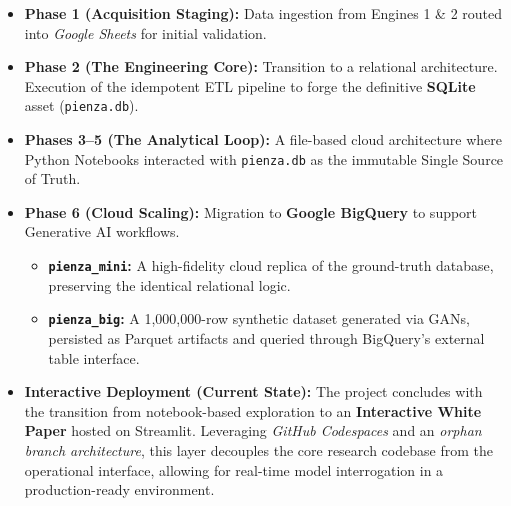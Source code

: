 \begin{itemize}
    \item \textbf{Phase 1 (Acquisition Staging):} Data ingestion from Engines 1 \& 2 routed into \textit{Google Sheets} for initial validation.
    \item \textbf{Phase 2 (The Engineering Core):} Transition to a relational architecture. Execution of the idempotent ETL pipeline to forge the definitive \textbf{SQLite} asset (\texttt{pienza.db}).
    \item \textbf{Phases 3--5 (The Analytical Loop):} A file-based cloud architecture where Python Notebooks interacted with \texttt{pienza.db} as the immutable Single Source of Truth.
    \item \textbf{Phase 6 (Cloud Scaling):} Migration to \textbf{Google BigQuery} to support Generative AI workflows.
    \begin{itemize}
        \item \textbf{\texttt{pienza\_mini}:} A high-fidelity cloud replica of the ground-truth database, preserving the identical relational logic.
        \item \textbf{\texttt{pienza\_big}:} A 1,000,000-row synthetic dataset generated via GANs, persisted as Parquet artifacts and queried through BigQuery's external table interface.
    \end{itemize}
    \item \textbf{Interactive Deployment (Current State):} The project concludes with the transition from notebook-based exploration to an \textbf{Interactive White Paper} hosted on Streamlit. Leveraging \textit{GitHub Codespaces} and an \textit{orphan branch architecture}, this layer decouples the core research codebase from the operational interface, allowing for real-time model interrogation in a production-ready environment.
\end{itemize}